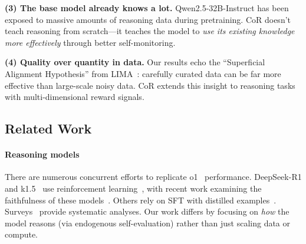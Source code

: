 \documentclass{article}
\theoremstyle{plain}
\theoremstyle{definition}
\theoremstyle{remark}
\begin{document}
\textbf{(3) The base model already knows a lot.} Qwen2.5-32B-Instruct has been exposed to massive amounts of reasoning data during pretraining. CoR doesn't teach reasoning from scratch---it teaches the model to \textit{use its existing knowledge more effectively} through better self-monitoring.

\textbf{(4) Quality over quantity in data.} Our results echo the ``Superficial Alignment Hypothesis'' from LIMA~\citep{zhou2023lima}: carefully curated data can be far more effective than large-scale noisy data. CoR extends this insight to reasoning tasks with multi-dimensional reward signals.

\subsection{Related Work}

\paragraph{Reasoning models} There are numerous concurrent efforts to replicate o1~\citep{o1} performance. DeepSeek-R1 and k1.5~\citep{r1, k1.5} use reinforcement learning~\citep{guo2025deepseek_r1_nature}, with recent work examining the faithfulness of these models~\citep{chua2025deepseek_faithful}. Others rely on SFT with distilled examples~\citep{sky_t1, xu2025redstardoesscalinglongcot, bespoke_stratos}. Surveys~\citep{zhang2025deepseek_r1_survey, xu2025large_reasoning_survey, wang2025trustworthy_survey} provide systematic analyses. Our work differs by focusing on \textit{how} the model reasons (via endogenous self-evaluation) rather than just scaling data or compute.
\end{document}
